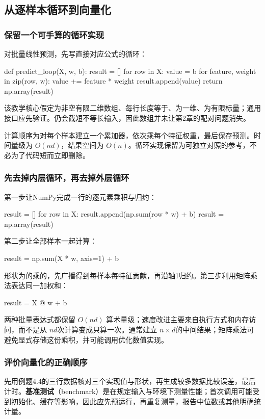\documentclass[UTF8,fontset=none,zihao=-4,a4paper]{ctexart}
\newcommand{\term}[1]{\textbf{#1}}
\newcommand{\code}[1]{\texttt{\detokenize{#1}}}
\numberwithin{equation}{section}
\numberwithin{figure}{section}
\begin{document}
\subsection{从逐样本循环到向量化}
\subsubsection{保留一个可手算的循环实现}
对批量线性预测，先写直接对应公式的循环：
\begin{pycode}
def predict_loop(X, w, b):
    result = []
    for row in X:
        value = b
        for feature, weight in zip(row, w):
            value += feature * weight
        result.append(value)
    return np.array(result)
\end{pycode}
该教学核心假定\code{X}为非空有限二维数组、每行长度等于\code{len(w)}、\code{w}为一维、\code{b}为有限标量；通用接口应先验证。\code{zip}仍会截短不等长输入，因此数组并未让第2章的配对问题消失。

计算顺序为对每个样本建立一个累加器，依次乘每个特征权重，最后保存预测。时间量级为 $O(nd)$，结果空间为 $O(n)$。循环实现保留为可独立对照的参考，不必为了代码短而立即删除。

\subsubsection{先去掉内层循环，再去掉外层循环}
第一步让NumPy完成一行的逐元素乘积与归约：
\begin{pycode}
result = []
for row in X:
    result.append(np.sum(row * w) + b)
result = np.array(result)
\end{pycode}
第二步让全部样本一起计算：
\begin{pycode}
result = np.sum(X * w, axis=1) + b
\end{pycode}
形状为\code{(n, d)}的\code{X}乘\code{(d,)}的\code{w}，先广播得到每样本每特征贡献，再沿轴1归约。第三步利用矩阵乘法表达同一加权和：
\begin{pycode}
result = X @ w + b
\end{pycode}
两种批量表达式都保留 $O(nd)$ 算术量级；速度改进主要来自执行方式和内存访问，而不是从 $nd$次计算变成只算一次。\code{X * w}通常建立 $n\times d$的中间结果；矩阵乘法可避免显式存储这份乘积，并可能调用优化数值实现。

\subsubsection{评价向量化的正确顺序}
先用例题4.4的三行数据核对三个实现值与形状，再生成较多数据比较误差，最后计时。\term{基准测试}（benchmark）是在规定输入与环境下测量性能；首次调用可能受到初始化、缓存等影响，因此应先预运行，再重复测量，报告中位数或其他明确统计量。
\end{document}
